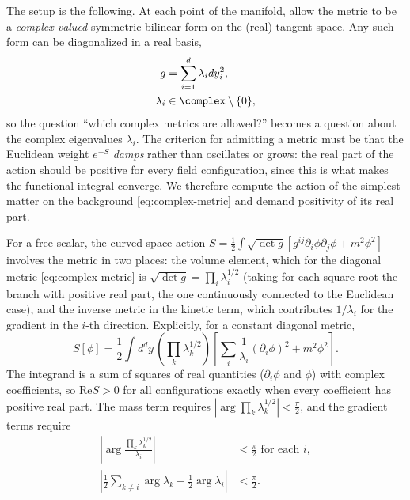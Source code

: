 The setup is the following. At each point of the manifold, allow the metric
to be a \emph{complex-valued} symmetric bilinear form on the (real) tangent
space. Any such form can be diagonalized in a real basis,
\begin{equation}
\begin{aligned}
g &= \sum_{i=1}^{d} \lambda_i dy_i^2,\\
\lambda_i &\in \complex\setminus\{0\},
\end{aligned}
\label{eq:complex-metric}
\end{equation}
so the question ``which complex metrics are allowed?'' becomes a question
about the complex eigenvalues $\lambda_i$. The criterion for admitting a
metric must be that the Euclidean weight $e^{-S}$ \emph{damps} rather than
oscillates or grows: the real part of the action should be positive for
every field configuration, since this is what makes the functional integral
converge. We therefore compute the action of the simplest matter on the
background \eqref{eq:complex-metric} and demand positivity of its real part.

For a free scalar, the curved-space action $S = \frac12\int \sqrt{\det g}
\left[ g^{ij}\partial_i\phi\partial_j\phi + m^2\phi^2\right]$ involves the
metric in two places: the volume element, which for the diagonal metric
\eqref{eq:complex-metric} is $\sqrt{\det g} = \prod_i \lambda_i^{1/2}$
(taking for each square root the branch with positive real part, the one
continuously connected to the Euclidean case), and the inverse metric in the
kinetic term, which contributes $1/\lambda_i$ for the gradient in the $i$-th
direction. Explicitly, for a constant diagonal metric,
\begin{equation}
S[\phi] = \frac{1}{2}\int d^dy\, \left(\prod_k \lambda_k^{1/2}\right)
\left[ \sum_i \frac{1}{\lambda_i}(\partial_i \phi)^2 + m^2 \phi^2 \right].
\label{eq:ks-scalar-action}
\end{equation}
The integrand is a sum of squares of real quantities ($\partial_i\phi$ and
$\phi$) with complex coefficients, so $\mathrm{Re} S > 0$ for all
configurations exactly when every coefficient has positive real part. The
mass term requires $|\arg \prod_k \lambda_k^{1/2}| < \frac\pi2$, and the
gradient terms require
\begin{equation}
\begin{aligned}
\left|\arg \frac{\prod_k \lambda_k^{1/2}}{\lambda_i}\right|
&< \frac\pi2 \text{ for each } i,\\
\left| \tfrac12 \textstyle\sum_{k \ne i} \arg\lambda_k
- \tfrac12 \arg\lambda_i \right|
&< \frac\pi2 .
\end{aligned}
\label{eq:ks-scalar-condition}
\end{equation}

